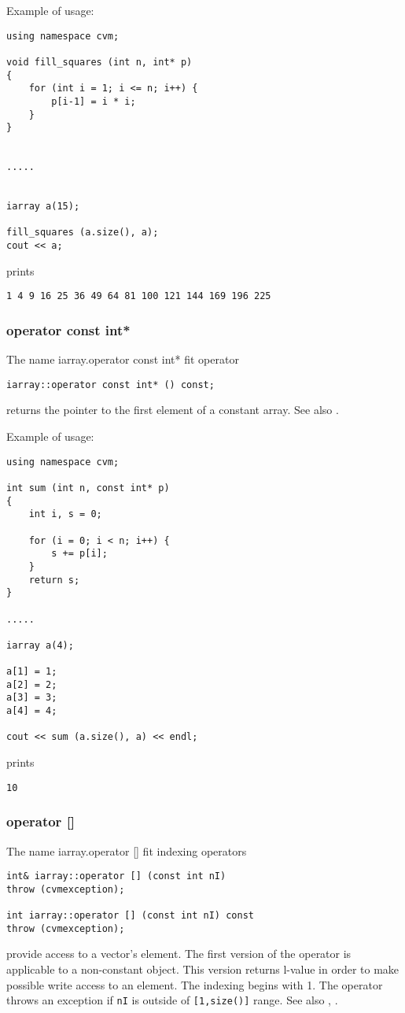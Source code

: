 Example of usage:
\begin{verbatim}
using namespace cvm;

void fill_squares (int n, int* p)
{
    for (int i = 1; i <= n; i++) {
        p[i-1] = i * i;
    }
}


.....


iarray a(15);

fill_squares (a.size(), a);
cout << a;
\end{verbatim}
prints
\begin{verbatim}
1 4 9 16 25 36 49 64 81 100 121 144 169 196 225
\end{verbatim}
\newpage





\subsubsection{operator const int*}
The%
\pdfdest name {iarray.operator const int*} fit
operator
\begin{verbatim}
iarray::operator const int* () const;
\end{verbatim}
returns the pointer to the first
element of a constant array.
See also .

Example of usage:
\begin{verbatim}
using namespace cvm;

int sum (int n, const int* p)
{
    int i, s = 0;

    for (i = 0; i < n; i++) {
        s += p[i];
    }
    return s;
}

.....

iarray a(4);

a[1] = 1;
a[2] = 2;
a[3] = 3;
a[4] = 4;

cout << sum (a.size(), a) << endl;
\end{verbatim}
prints
\begin{verbatim}
10
\end{verbatim}
\newpage







\subsubsection{operator []}
The%
\pdfdest name {iarray.operator []} fit
indexing operators
\begin{verbatim}
int& iarray::operator [] (const int nI)
throw (cvmexception);

int iarray::operator [] (const int nI) const
throw (cvmexception);
\end{verbatim}
provide access to a vector's element. The first version
of the operator is applicable to a non-constant object.
This version returns l-value
in order to make possible write access to an element.
The indexing begins with 1. The operator throws an exception
if \verb"nI" is outside of \verb"[1,size()]" range.
See also , .

